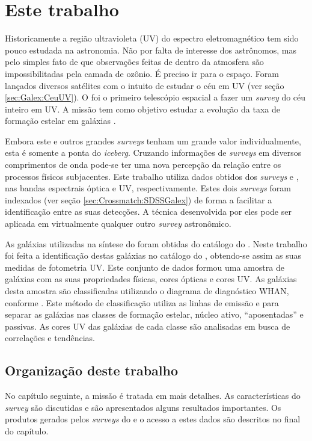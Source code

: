 \section{Este trabalho}
\label{sec:Intro:EsteTrab}

Historicamente a região ultravioleta (UV) do espectro eletromagnético tem sido
pouco estudada na astronomia. Não por falta de interesse dos astrônomos, mas
pelo simples fato de que observações feitas de dentro da atmosfera são
impossibilitadas pela camada de ozônio. É preciso ir para o espaço. Foram
lançados diversos satélites com o intuito de estudar o céu em UV (ver seção
\ref{sec:Galex:CeuUV}). O \galex foi o primeiro telescópio espacial a fazer um
{\em survey} do céu inteiro em UV. A missão tem como objetivo estudar a evolução
da taxa de formação estelar em galáxias \citep{Martin2005}.

Embora este e outros grandes {\em surveys} tenham um grande valor
individualmente, esta é somente a ponta do {\em iceberg}. Cruzando informações
de {\em surveys} em diversos comprimentos de onda pode-se ter uma nova percepção
da relação entre os processos físicos subjacentes. Este trabalho utiliza dados
obtidos dos {\em surveys} \SDSS e \galex, nas bandas espectrais óptica e UV,
respectivamente. Estes dois {\em surveys} foram indexados (ver seção
\ref{sec:Crossmatch:SDSSGalex}) de forma a facilitar a identificação entre as
suas detecções. A técnica desenvolvida por eles pode ser aplicada em
virtualmente qualquer outro {\em survey} astronômico.

As galáxias utilizadas na síntese do \starlight foram obtidas do catálogo do
\SDSS. Neste trabalho foi feita a identificação destas galáxias no catálogo do
\galex, obtendo-se assim as suas medidas de fotometria UV. Este conjunto de
dados formou uma amostra de galáxias com as suas propriedades físicas, cores
ópticas e cores UV. As galáxias desta amostra são classificadas utilizando o
diagrama de diagnóstico WHAN, conforme \citet{CidFernandes2011}. Este método de
classificação utiliza as linhas de emissão \Halpha e \NII para separar as
galáxias nas classes de formação estelar, núcleo ativo, ``aposentadas'' e
passivas. As cores UV das galáxias de cada classe são analisadas em busca de
correlações e tendências.

\subsection{Organização deste trabalho}

No capítulo seguinte, a missão \galex é tratada em mais detalhes. As
características do {\em survey} são discutidas e são apresentados alguns
resultados importantes. Os produtos gerados pelos {\em surveys} do \galex e o
acesso a estes dados são descritos no final do capítulo.

